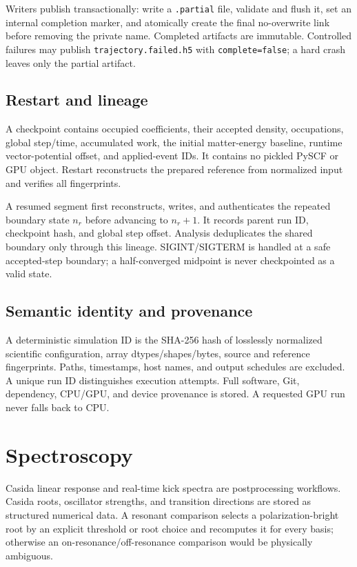 \documentclass[11pt]{article}
\newcommand{\code}[1]{\texttt{#1}}
\begin{document}
Writers publish transactionally: write a \code{.partial} file, validate and
flush it, set an internal completion marker, and atomically create the final
no-overwrite link before removing the private name.
Completed artifacts are immutable. Controlled failures may publish
\code{trajectory.failed.h5} with \code{complete=false}; a hard crash leaves
only the partial artifact.

\subsection{Restart and lineage}

A checkpoint contains occupied coefficients, their accepted density,
occupations, global step/time, accumulated work, the initial matter-energy
baseline, runtime vector-potential offset, and applied-event IDs.
It contains no pickled PySCF or GPU object. Restart reconstructs the prepared
reference from normalized input and verifies all fingerprints.

A resumed segment first reconstructs, writes, and authenticates the repeated
boundary state \(n_r\) before advancing to \(n_r+1\). It records parent run
ID, checkpoint hash, and global step offset. Analysis deduplicates the shared
boundary only through this lineage. SIGINT/SIGTERM is handled at a safe
accepted-step boundary; a half-converged midpoint is never checkpointed as a
valid state.

\subsection{Semantic identity and provenance}

A deterministic simulation ID is the SHA-256 hash of losslessly normalized
scientific configuration, array dtypes/shapes/bytes, source and reference
fingerprints. Paths, timestamps, host names, and output schedules are
excluded. A unique run ID distinguishes execution attempts. Full software,
Git, dependency, CPU/GPU, and device provenance is stored. A requested GPU
run never falls back to CPU.

\section{Spectroscopy}

Casida linear response and real-time kick spectra are postprocessing
workflows. Casida roots, oscillator strengths, and transition directions are
stored as structured numerical data\cite{Casida1995}. A resonant comparison
selects a polarization-bright root by an explicit threshold or root choice and
recomputes it for every basis; otherwise an on-resonance/off-resonance
comparison would be physically ambiguous.
\end{document}
